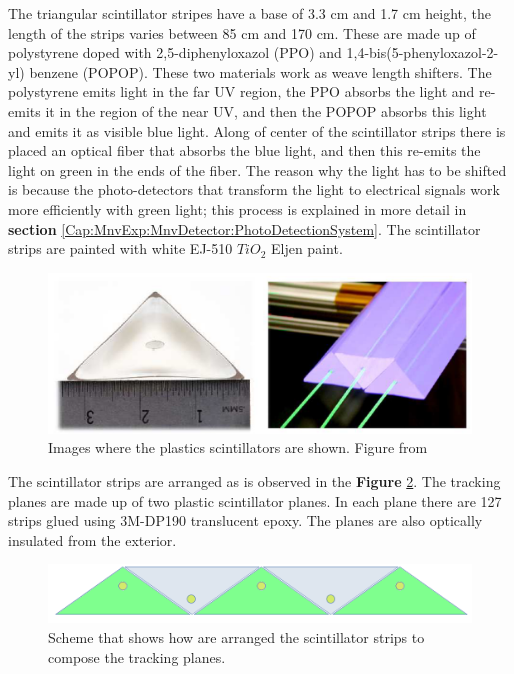 The triangular scintillator stripes have a base of 3.3 cm and 1.7 cm height, the length of the strips varies between 85 cm and 170 cm. These are made up of polystyrene doped with 2,5-diphenyloxazol (PPO) and 1,4-bis(5-phenyloxazol-2-yl) benzene (POPOP). These two materials work as weave length shifters. The polystyrene emits light in the far UV region, the PPO absorbs the light and re-emits it in the region of the near UV, and then the POPOP absorbs this light and emits it as visible blue light. Along of center of the scintillator strips there is placed an optical fiber that absorbs the blue light, and then this re-emits the light on green in the ends of the fiber. The reason why the light has to be shifted is because the photo-detectors that transform the light to electrical signals work more efficiently with green light; this process is explained in more detail in \textbf{section} \ref{Cap:MnvExp:MnvDetector:PhotoDetectionSystem}. The scintillator strips are painted with white EJ-510 $TiO_2$ Eljen paint\cite{StripsPaint}. 


\begin{figure}[!htb]
\centering
\includegraphics[scale=0.3]{Figures/Chapter2/ScintStripes.png}

        \caption{Images where the plastics scintillators are shown. Figure from \cite{MINERvA}} 
\label{fig:MnvExp:MnvDetector:TriangularStripes}
\end{figure}

The scintillator strips are arranged as is observed in the \textbf{Figure} \ref{fig:MnvExp:MnvDetector:StripsArrange}. The tracking planes are made up of two plastic scintillator planes. In each plane there are 127 strips glued using 3M-DP190 translucent epoxy. The planes are also optically insulated from the exterior. 

\begin{figure}[!htb]
\centering
\includegraphics[scale=0.3]{Figures/Chapter2/stripsArrange.png}

        \caption{Scheme that shows how are arranged the scintillator strips to compose the tracking planes.} 
\label{fig:MnvExp:MnvDetector:StripsArrange}
\end{figure}

